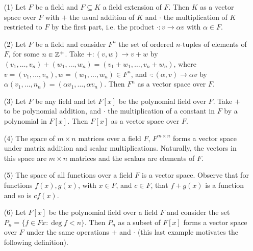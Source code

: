 \begin{example}
    \begin{enumerate}
        \item[(1)] Let $F$ be a field and  $F \subseteq K$ a field extension of  $F$.
            Then  $K$ as a vector space over  $F$ with  $+$ the usual addition
            of  $K$ and  $\cdot$ the multiplication of  $K$ restricted to  $F$
            by the first part, i.e. the product  $\cdot:v \rightarrow \alpha v$
            with $\alpha \in F$.

        \item[(2)] Let  $F$ be a field and consider  $F^n$ the set of ordered
            $n$-tuples of elements of $F$, for some  $n \in \mathbb{Z}^+$. Take $+:(v,w)
            \rightarrow v+w$ by $(v_1, \dots, v_n)+(w_1, \dots, w_n)=(v_1+w_1,
            \dots, v_n+w_n)$, where $v=(v_1, \dots, v_n), w=(w_1, \dots, w_n)
            \in F^n$, and $\cdot:(\alpha,v) \rightarrow \alpha v$ by
            $\alpha(v_1, \dots, n_n)=(\alpha v_1, \dots, \alpha v_n)$. Then
            $F^n$ as a vector space over  $F$.

        \item[(3)] Let  $F$ be any field and let  $F[x]$ be the polynomial field over
            $F$. Take  $+$ to be polynomial addition, and  $\cdot$ the
            multiplication of a constant in $F$ by a polynomial in $F[x]$. Then
            $F[x]$ as a vector space over $F$.

         \item[(4)] The space of $m \times n$ matrices over a field  $F$,  
             $F^{m \times n}$ forms a vector space under matrix addition and 
             scalar multiplications. Naturally, the vectors in this space are 
             $m \times n$ matrices and the scalars are elements of  $F$.

        \item[(5)] The space of all functions over a field $F$ is a vector space. 
            Observe that for functions $f(x), g(x)$, with $x \in F$, and $c \in F$, 
            that  $f+g(x)$ is a function and so is $cf(x)$.

        \item[(6)] Let  $F[x]$ be the polynomial field over a field $F$ and consider
            the set  $P_n=\{f \in F{x}: \deg{f}<n\}$. Then $P_n$ as a subset of
             $F[x]$ forms a vector space over $F$ under the same operations  $+$
             and  $\cdot$ (this last example motivates the following
             definition).
    \end{enumerate}
\end{example}

